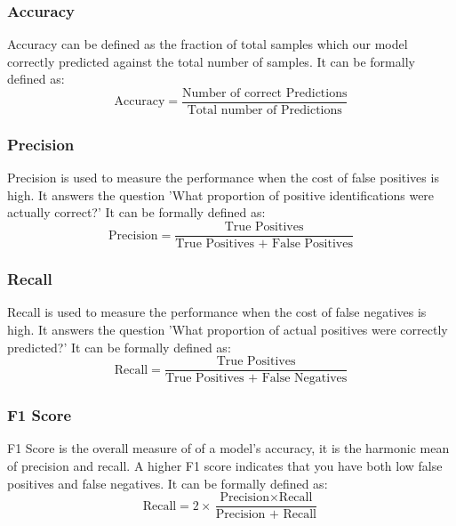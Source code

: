 \documentclass[fleqn,usenatbib]{mnras}
\begin{document}
\subsubsection{Accuracy}
\hspace*{0.25 in} Accuracy can be defined as the fraction of total samples which our model correctly predicted against the total number of samples. It can be formally defined as:
\begin{equation}
\text{Accuracy} = \frac{\text{Number of correct Predictions}}{\text{Total number of Predictions}}
\end{equation}

\subsubsection{Precision}
\hspace*{0.25 in} Precision is used to measure the performance when the cost of false positives is high. It answers the question 'What proportion of positive identifications were actually correct?' It can be formally defined as: 
\begin{equation}
\text{Precision} = \frac{\text{True Positives}}{\text{True Positives + False Positives}}
\end{equation}

\subsubsection{Recall}
\hspace*{0.25 in} Recall is used to measure the performance when the cost of false negatives is high.  It answers the question 'What proportion of actual positives were correctly predicted?' It can be formally defined as: 
\begin{equation}
\text{Recall} = \frac{\text{True Positives}}{\text{True Positives + False Negatives}}
\end{equation}

\subsubsection{F1 Score}
\hspace*{0.25 in} F1 Score is the overall measure of of a model's accuracy, it is the harmonic mean of precision and recall. A higher F1 score indicates that you have both low false positives and false negatives. It can be formally defined as: 
\begin{equation}
\text{Recall} = 2\times \frac{\text{Precision} \times \text{Recall}}{\text{Precision + Recall}}
\end{equation}
\end{document}
